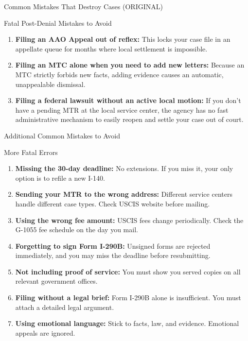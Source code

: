 \documentclass[11pt]{beamer}
\begin{document}
	\begin{frame}{Common Mistakes That Destroy Cases (ORIGINAL)}
		\scriptsize
		\begin{block}{Fatal Post-Denial Mistakes to Avoid}
			\begin{enumerate}
				\item \textbf{Filing an AAO Appeal out of reflex:} This locks your case file in an appellate queue for months where local settlement is impossible.
				\item \textbf{Filing an MTC alone when you need to add new letters:} Because an MTC strictly forbids new facts, adding evidence causes an automatic, unappealable dismissal.
				\item \textbf{Filing a federal lawsuit without an active local motion:} If you don't have a pending MTR at the local service center, the agency has no fast administrative mechanism to easily reopen and settle your case out of court.
			\end{enumerate}
		\end{block}
	\end{frame}
	
	
	\begin{frame}{Additional Common Mistakes to Avoid}
		\scriptsize
		\begin{block}{More Fatal Errors}
			\begin{enumerate}
				\item \textbf{Missing the 30-day deadline:} No extensions. If you miss it, your only option is to refile a new I-140.
				\item \textbf{Sending your MTR to the wrong address:} Different service centers handle different case types. Check USCIS website before mailing.
				\item \textbf{Using the wrong fee amount:} USCIS fees change periodically. Check the G-1055 fee schedule on the day you mail.
				\item \textbf{Forgetting to sign Form I-290B:} Unsigned forms are rejected immediately, and you may miss the deadline before resubmitting.
				\item \textbf{Not including proof of service:} You must show you served copies on all relevant government offices.
				\item \textbf{Filing without a legal brief:} Form I-290B alone is insufficient. You must attach a detailed legal argument.
				\item \textbf{Using emotional language:} Stick to facts, law, and evidence. Emotional appeals are ignored.
			\end{enumerate}
		\end{block}
	\end{frame}
	
\end{document}
